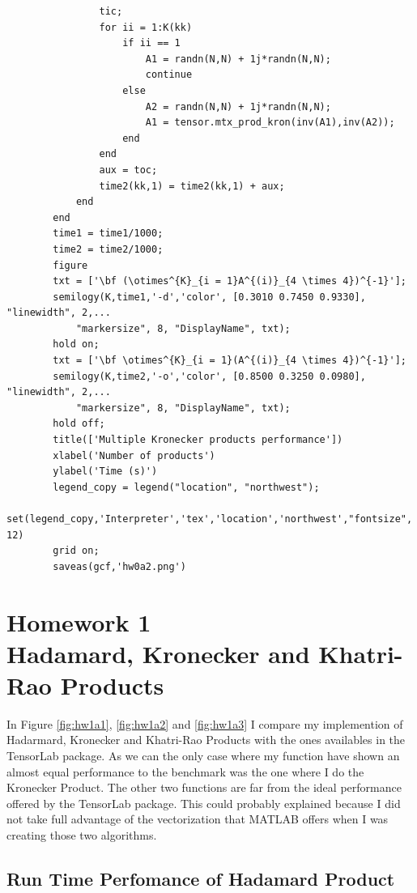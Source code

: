 \documentclass[a4paper,10pt]{article}
\begin{document}
\begin{verbatim}
                tic;
                for ii = 1:K(kk)    
                    if ii == 1
                        A1 = randn(N,N) + 1j*randn(N,N); 
                        continue
                    else
                        A2 = randn(N,N) + 1j*randn(N,N);
                        A1 = tensor.mtx_prod_kron(inv(A1),inv(A2));
                    end    
                end
                aux = toc;
                time2(kk,1) = time2(kk,1) + aux;
            end
        end
        time1 = time1/1000;
        time2 = time2/1000;
        figure
        txt = ['\bf (\otimes^{K}_{i = 1}A^{(i)}_{4 \times 4})^{-1}'];
        semilogy(K,time1,'-d','color', [0.3010 0.7450 0.9330], "linewidth", 2,...
            "markersize", 8, "DisplayName", txt);
        hold on;
        txt = ['\bf \otimes^{K}_{i = 1}(A^{(i)}_{4 \times 4})^{-1}'];
        semilogy(K,time2,'-o','color', [0.8500 0.3250 0.0980], "linewidth", 2,...
            "markersize", 8, "DisplayName", txt);
        hold off;
        title(['Multiple Kronecker products performance'])
        xlabel('Number of products')
        ylabel('Time (s)')
        legend_copy = legend("location", "northwest");
        set(legend_copy,'Interpreter','tex','location','northwest',"fontsize", 12)
        grid on;
        saveas(gcf,'hw0a2.png')
    \end{verbatim}

\newpage
\section*{Homework 1 \\ Hadamard, Kronecker and Khatri-Rao Products}

    In Figure \ref{fig:hw1a1}, \ref{fig:hw1a2} and \ref{fig:hw1a3} I compare my implemention of Hadarmard, Kronecker and Khatri-Rao Products with the ones availables in the TensorLab package.
    As we can the only case where my function have shown an almost equal performance to the benchmark was the one where I do the Kronecker Product. The other two functions are far from the ideal
    performance offered by the TensorLab package. This could probably explained because I did not take full advantage of the vectorization that MATLAB offers when I was creating those two algorithms.

    \subsection*{Run Time Perfomance of Hadamard Product}
\end{document}
